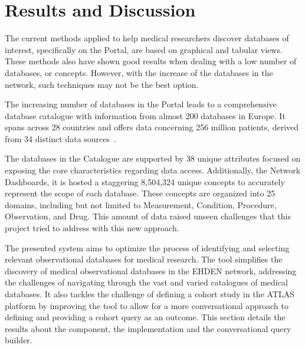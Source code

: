 \chapter{Results and Discussion}
\label{chapter:RD}



The current methods applied to help medical researchers discover databases of interest, specifically on the {\ehden} Portal, are based on graphical and tabular views. These methods also have shown good results when dealing with a low number of databases, or concepts. However, with the increase of the databases in the network, such techniques may not be the best option.

The increasing number of databases in the {\ehden} Portal leads to a comprehensive database catalogue with information from almost 200 databases in Europe. It spans across 28 countries and offers data concerning 256 million patients, derived from 34 distinct data sources~\cite{reis2024chatbotlike}. 

The databases in the {\ehden} Catalogue are supported by 38 unique attributes focused on exposing the core characteristics regarding data access. Additionally, the {\ehden} Network Dashboards, it is hosted a staggering 8,504,324 unique concepts to accurately represent the scope of each database. These concepts are organized into 25 domains, including but not limited to Measurement, Condition, Procedure, Observation, and Drug. This amount of data raised unseen challenges that this project tried to address with this new approach.

The presented system aims to optimize the process of identifying and selecting relevant observational databases for medical research. The tool simplifies the discovery of medical observational databases in the EHDEN network, addressing the challenges of navigating through the vast and varied catalogues of medical databases. It also tackles the challenge of defining a cohort study in the ATLAS platform by improving the tool to allow for a more conversational approach to defining and providing a cohort query as an outcome. This section details the results about the {\ir} component, the {\llm} implementation and the conversational query builder.


